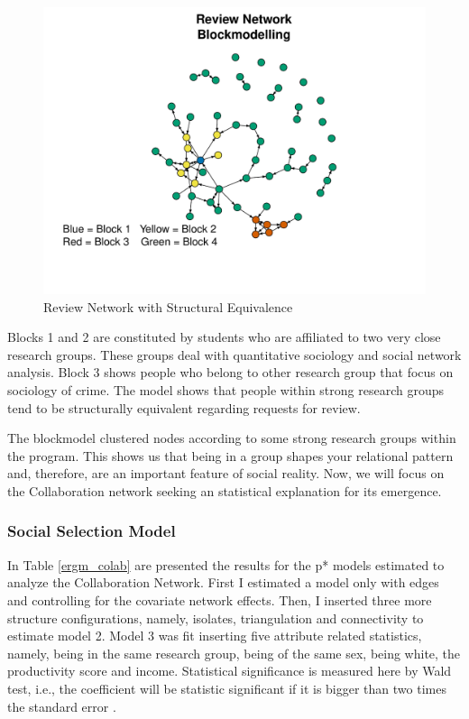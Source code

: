 \documentclass[a4paper, 12pt, openright, oneside, article, german, french, brazil, english]{abntex2}
\begin{document}
\begin{figure}[h]
	\centering
	\caption{Review Network with Structural Equivalence}
	\label{net-blocks}
	\includegraphics[scale=.6]{net_block.pdf}
\end{figure}

Blocks 1 and 2 are constituted by students who are affiliated to two very close research groups. These groups deal with quantitative sociology and social network analysis. Block 3 shows people who belong to other research group that focus on sociology of crime. The model shows that people within strong research groups tend to be structurally equivalent regarding requests for review.

The blockmodel clustered nodes according to some strong research groups within the program. This shows us that being in a group shapes your relational pattern and, therefore, are an important feature of social reality. Now, we will focus on the Collaboration network seeking an statistical explanation for its emergence.

\subsubsection{Social Selection Model}

In Table \ref{ergm_colab} are presented the results for the p* models estimated to analyze the Collaboration Network. First I estimated a model only with edges and controlling for the covariate network effects. Then, I inserted three more structure configurations, namely, isolates, triangulation and connectivity to estimate model 2. Model 3 was fit inserting five attribute related statistics, namely, being in the same research group, being of the same sex, being white, the productivity score and income. Statistical significance is measured here by Wald test, i.e., the coefficient will be statistic significant if it is bigger than two times the standard error \cite{lusher2013exponential,lazega2014redes}.
\end{document}
